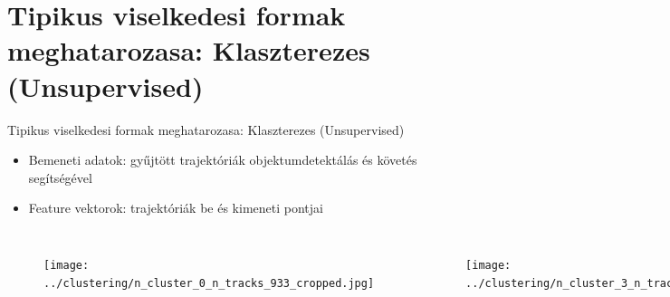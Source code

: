 \documentclass{beamer}
\begin{document}
\section{Tipikus viselkedesi formak meghatarozasa: Klaszterezes (Unsupervised)}
\begin{frame}{Tipikus viselkedesi formak meghatarozasa: Klaszterezes (Unsupervised)}
    \begin{itemize}
        \item Bemeneti adatok: gyűjtött trajektóriák objektumdetektálás és követés segítségével
        \item Feature vektorok: trajektóriák be és kimeneti pontjai
    \end{itemize}
    \begin{columns}
        \begin{figure}
            \texttt{[image: ../clustering/n\_cluster\_0\_n\_tracks\_933\_cropped.jpg]}
        \end{figure}
        \begin{figure}
            \texttt{[image: ../clustering/n\_cluster\_3\_n\_tracks\_892\_cropped.jpg]}
        \end{figure}
        \begin{figure}
            \texttt{[image: ../clustering/n\_cluster\_5\_n\_tracks\_130\_cropped.jpg]}
        \end{figure}
    \end{columns}
\end{frame}
\end{document}
